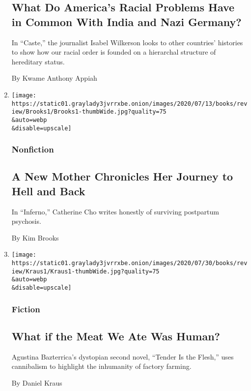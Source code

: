 \begin{enumerate}
  \hypertarget{what-do-americas-racial-problems-have-in-common-with-india-and-nazi-germany}{%
  \subsection{What Do America's Racial Problems Have in Common With
  India and Nazi
  Germany?}\label{what-do-americas-racial-problems-have-in-common-with-india-and-nazi-germany}}

  In ``Caste,'' the journalist Isabel Wilkerson looks to other
  countries' histories to show how our racial order is founded on a
  hierarchal structure of hereditary status.

  By Kwame Anthony Appiah
\item
  \href{/2020/08/04/books/review/inferno-catherine-cho.html}{}

  \texttt{[image: https://static01.graylady3jvrrxbe.onion/images/2020/07/13/books/review/Brooks1/Brooks1-thumbWide.jpg?quality=75\\\&auto=webp\\\&disable=upscale]}

  \hypertarget{nonfiction-5}{%
  \subsubsection{Nonfiction}\label{nonfiction-5}}

  \hypertarget{a-new-mother-chronicles-her-journey-to-hell-and-back}{%
  \subsection{A New Mother Chronicles Her Journey to Hell and
  Back}\label{a-new-mother-chronicles-her-journey-to-hell-and-back}}

  In ``Inferno,'' Catherine Cho writes honestly of surviving postpartum
  psychosis.

  By Kim Brooks
\item
  \href{/2020/08/04/books/review/tender-is-the-flesh-agustina-bazterrica.html}{}

  \texttt{[image: https://static01.graylady3jvrrxbe.onion/images/2020/07/30/books/review/Kraus1/Kraus1-thumbWide.jpg?quality=75\\\&auto=webp\\\&disable=upscale]}

  \hypertarget{fiction}{%
  \subsubsection{Fiction}\label{fiction}}

  \hypertarget{what-if-the-meat-we-ate-was-human}{%
  \subsection{What if the Meat We Ate Was
  Human?}\label{what-if-the-meat-we-ate-was-human}}

  Agustina Bazterrica's dystopian second novel, ``Tender Is the Flesh,''
  uses cannibalism to highlight the inhumanity of factory farming.

  By Daniel Kraus
\end{enumerate}

